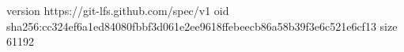 version https://git-lfs.github.com/spec/v1
oid sha256:cc324ef6a1ed84080fbbf3d061e2ee9618ffebeecb86a58b39f3e6c521e6cf13
size 61192

